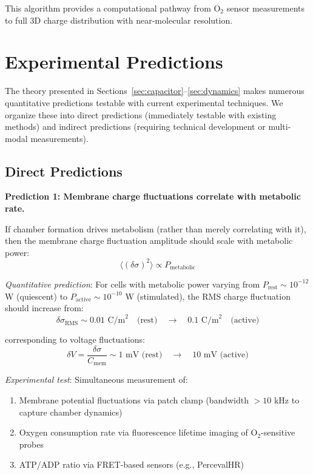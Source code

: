\documentclass[twocolumn,10pt,aps,prd,superscriptaddress,floatfix,nofootinbib]{revtex4-2}
\theoremstyle{remark}
\begin{document}
This algorithm provides a computational pathway from O$_2$ sensor measurements to full 3D charge distribution with near-molecular resolution.

\section{Experimental Predictions}
\label{sec:predictions}

The theory presented in Sections~\ref{sec:capacitor}--\ref{sec:dynamics} makes numerous quantitative predictions testable with current experimental techniques. We organize these into direct predictions (immediately testable with existing methods) and indirect predictions (requiring technical development or multi-modal measurements).

\subsection{Direct Predictions}

\textbf{Prediction 1: Membrane charge fluctuations correlate with metabolic rate.}

If chamber formation drives metabolism (rather than merely correlating with it), then the membrane charge fluctuation amplitude should scale with metabolic power:
\begin{equation}
\langle(\delta\sigma)^2\rangle \propto P_{\mathrm{metabolic}}
\label{eq:pred_charge_metabolism}
\end{equation}

\textit{Quantitative prediction}: For cells with metabolic power varying from $P_{\mathrm{rest}} \sim 10^{-12}$ W (quiescent) to $P_{\mathrm{active}} \sim 10^{-10}$ W (stimulated), the RMS charge fluctuation should increase from:
\begin{equation}
\delta\sigma_{\mathrm{RMS}} \sim 0.01 \text{ C/m}^2 \quad \text{(rest)} \quad \to \quad 0.1 \text{ C/m}^2 \quad \text{(active)}
\end{equation}

corresponding to voltage fluctuations:
\begin{equation}
\delta V = \frac{\delta\sigma}{C_{\mathrm{mem}}} \sim 1 \text{ mV (rest)} \quad \to \quad 10 \text{ mV (active)}
\end{equation}

\textit{Experimental test}: Simultaneous measurement of:
\begin{enumerate}
\item Membrane potential fluctuations via patch clamp (bandwidth $>10$ kHz to capture chamber dynamics)
\item Oxygen consumption rate via fluorescence lifetime imaging of O$_2$-sensitive probes
\item ATP/ADP ratio via FRET-based sensors (e.g., PercevalHR)
\end{enumerate}
\end{document}
